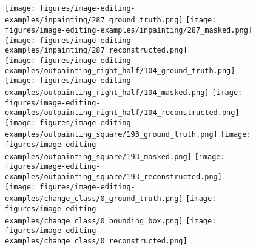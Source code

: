 \begin{figure}[t]
    \hhs
    \hhs
    \vvs
    \\
    \texttt{[image: figures/image-editing-examples/inpainting/287\_ground\_truth.png]}\hhs
    \texttt{[image: figures/image-editing-examples/inpainting/287\_masked.png]}\hhs
    \texttt{[image: figures/image-editing-examples/inpainting/287\_reconstructed.png]}\vvs
    \\
    \texttt{[image: figures/image-editing-examples/outpainting\_right\_half/104\_ground\_truth.png]}\hhs
    \texttt{[image: figures/image-editing-examples/outpainting\_right\_half/104\_masked.png]}\hhs
    \texttt{[image: figures/image-editing-examples/outpainting\_right\_half/104\_reconstructed.png]}\vvs
    \\
    \texttt{[image: figures/image-editing-examples/outpainting\_square/193\_ground\_truth.png]}\hhs
    \texttt{[image: figures/image-editing-examples/outpainting\_square/193\_masked.png]}\hhs
    \texttt{[image: figures/image-editing-examples/outpainting\_square/193\_reconstructed.png]}\vvs
    \\
    \texttt{[image: figures/image-editing-examples/change\_class/0\_ground\_truth.png]}\hhs
    \texttt{[image: figures/image-editing-examples/change\_class/0\_bounding\_box.png]}\hhs
    \texttt{[image: figures/image-editing-examples/change\_class/0\_reconstructed.png]}\vvs
    \\
    \vspace{-10pt}
    \vspace{-10pt}
    \label{fig:editing}
\end{figure}

